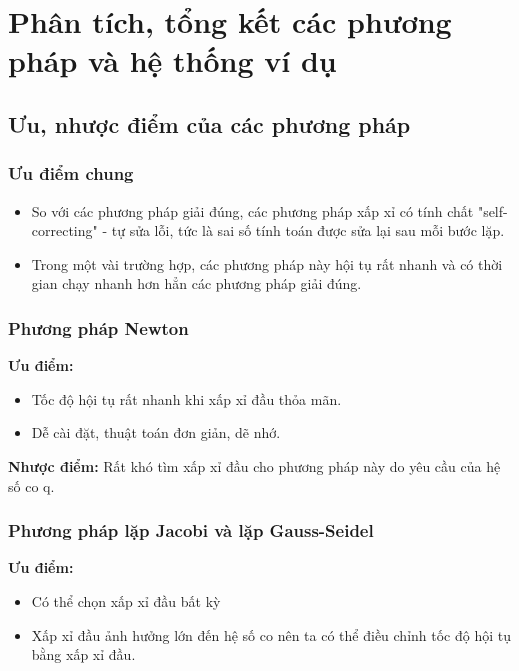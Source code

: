 \section{Phân tích, tổng kết các phương pháp và hệ thống ví dụ}
\subsection{Ưu, nhược điểm của các phương pháp}
    
    \subsubsection{Ưu điểm chung}
        \begin{itemize}
            \item So với các phương pháp giải đúng, các phương pháp xấp xỉ có tính chất "self-correcting"\cite{nummethodMATLAB} - tự sửa lỗi, tức là sai số tính toán được sửa lại sau mỗi bước lặp.
            
            \item Trong một vài trường hợp, các phương pháp này hội tụ rất nhanh và có thời gian chạy nhanh hơn hẳn các phương pháp giải đúng.
        \end{itemize}

    \subsubsection{Phương pháp Newton}
        \par \textbf{Ưu điểm:}
        \begin{itemize}
            \item Tốc độ hội tụ rất nhanh khi xấp xỉ đầu thỏa mãn.
            \item Dễ cài đặt, thuật toán đơn giản, dẽ nhớ.
        \end{itemize}

        \par \textbf{Nhược điểm:} Rất khó tìm xấp xỉ đầu cho phương pháp này do yêu cầu của hệ số co q.

    \subsubsection{Phương pháp lặp Jacobi và lặp Gauss-Seidel}
        \par \textbf{Ưu điểm:}
        \begin{itemize}
            \item Có thể chọn xấp xỉ đầu bất kỳ
            \item Xấp xỉ đầu ảnh hưởng lớn đến hệ số co nên ta có thể điều chỉnh tốc độ hội tụ bằng xấp xỉ đầu.
        \end{itemize}
        
